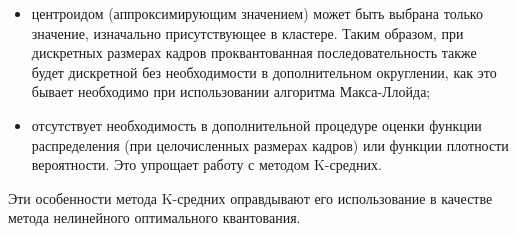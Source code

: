 \begin{itemize}
    \item центроидом (аппроксимирующим значением) может быть выбрана
        только значение, изначально присутствующее в кластере.
        Таким образом, при дискретных размерах кадров проквантованная
        последовательность также будет дискретной без необходимости
        в дополнительном округлении, как это бывает необходимо при
        использовании алгоритма Макса-Ллойда;
    \item отсутствует необходимость в дополнительной процедуре оценки
        функции распределения (при целочисленных размерах кадров)
        или функции плотности вероятности. Это упрощает работу
        с методом K-средних.
\end{itemize}

\hspace{8pt}

Эти особенности метода K-средних оправдывают его использование в
качестве метода нелинейного оптимального квантования.
